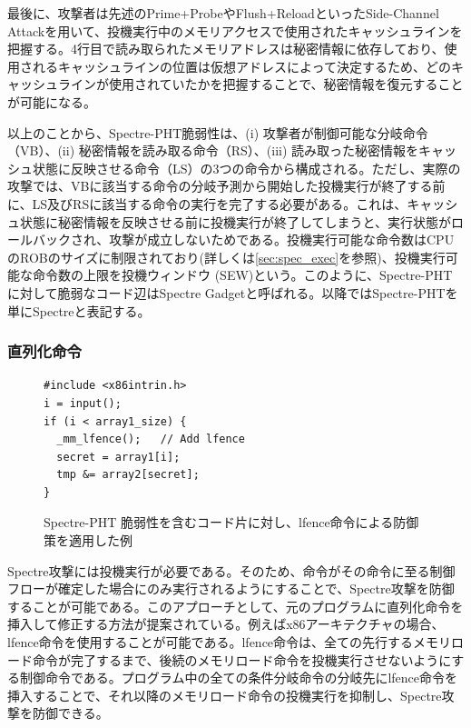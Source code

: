 最後に、攻撃者は先述のPrime+ProbeやFlush+ReloadといったSide-Channel Attackを用いて、投機実行中のメモリアクセスで使用されたキャッシュラインを把握する。4行目で読み取られたメモリアドレスは秘密情報に依存しており、使用されるキャッシュラインの位置は仮想アドレスによって決定するため、どのキャッシュラインが使用されていたかを把握することで、秘密情報を復元することが可能になる。\par
以上のことから、Spectre-PHT脆弱性は、(i) 攻撃者が制御可能な分岐命令（VB）、(ii) 秘密情報を読み取る命令（RS）、(iii) 読み取った秘密情報をキャッシュ状態に反映させる命令（LS）の3つの命令から構成される。ただし、実際の攻撃では、VBに該当する命令の分岐予測から開始した投機実行が終了する前に、LS及びRSに該当する命令の実行を完了する必要がある。これは、キャッシュ状態に秘密情報を反映させる前に投機実行が終了してしまうと、実行状態がロールバックされ、攻撃が成立しないためである。投機実行可能な命令数はCPUのROBのサイズに制限されており(詳しくは\ref{sec:spec_exec}を参照)、投機実行可能な命令数の上限を投機ウィンドウ (SEW)という。このように、Spectre-PHTに対して脆弱なコード辺はSpectre Gadgetと呼ばれる。以降ではSpectre-PHTを単にSpectreと表記する。


\subsubsection{直列化命令}

\begin{figure}
  \begin{verbatim}
#include <x86intrin.h>
i = input();
if (i < array1_size) {
  _mm_lfence();   // Add lfence
  secret = array1[i];  
  tmp &= array2[secret];  
}
\end{verbatim}
  \caption{Spectre-PHT 脆弱性を含むコード片に対し、lfence命令による防御策を適用した例}
  \label{lfence}
\end{figure}

Spectre攻撃には投機実行が必要である。そのため、命令がその命令に至る制御フローが確定した場合にのみ実行されるようにすることで、Spectre攻撃を防御することが可能である。このアプローチとして、元のプログラムに直列化命令を挿入して修正する方法が提案されている\cite{8835233}。例えばx86アーキテクチャの場合、lfence命令を使用することが可能である。lfence命令は、全ての先行するメモリロード命令が完了するまで、後続のメモリロード命令を投機実行させないようにする制御命令である。プログラム中の全ての条件分岐命令の分岐先にlfence命令を挿入することで、それ以降のメモリロード命令の投機実行を抑制し、Spectre攻撃を防御できる。\par

